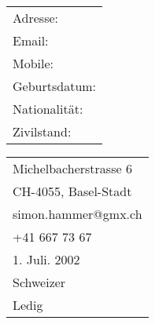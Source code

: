     \vfill\noindent
    \begin{tabular}[t]{@{}l} 
        Adresse: \\
        Email: \\
        Mobile: \\
        Geburtsdatum: \\
        Nationalität: \\
        Zivilstand: \\
    \end{tabular}
    \hfill%
    \begin{tabular}[t]{l@{}}
        Michelbacherstrasse 6\\
        CH-4055, Basel-Stadt\\
        simon.hammer@gmx.ch \\
        +41 667 73 67 \\
        1. Juli. 2002 \\
        Schweizer \\
        Ledig 
    \end{tabular}


